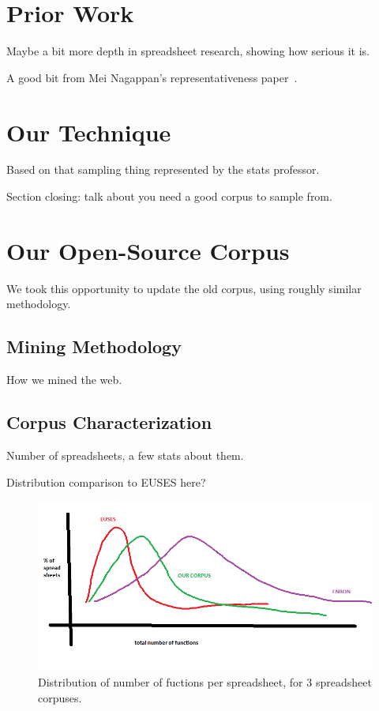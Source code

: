 \documentclass{sig-alternate} %
\begin{document}
\section{Prior Work}

Maybe a bit more depth in spreadsheet research, showing how serious it is.

A good bit from Mei Nagappan's representativeness paper~\cite{nag13}.

\section{Our Technique}

Based on that sampling thing represented by the stats professor.

Section closing: talk about you need a good corpus to sample from.

\section{Our Open-Source Corpus}

We took this opportunity to update the old corpus, using roughly similar
methodology.

\subsection{Mining Methodology}

How we mined the web.

\subsection{Corpus Characterization}

Number of spreadsheets, a few stats about them.

Distribution comparison to EUSES here?

\begin{figure}
\centering
\includegraphics[width=\columnwidth]{functions.png}
\caption{Distribution of number of fuctions per spreadsheet, for 3 spreadsheet corpuses.}
\label{fig:effectiveness}
\end{figure}
\end{document}
